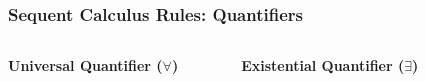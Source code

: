\documentclass{beamer}
\begin{document}
      \begin{frame}
      \frametitle{Sequent Calculus Rules: Quantifiers}
      \begin{columns}
      
      \textbf{Universal Quantifier ($\forall$)}
      \begin{prooftree}
      \end{prooftree}
      
      \begin{prooftree}
      \end{prooftree}
      
      \textbf{Existential Quantifier ($\exists$)}
      \begin{prooftree}
      \end{prooftree}
      
      \begin{prooftree}
      \end{prooftree}
      
      \end{columns}
      \end{frame}
      
\end{document}
